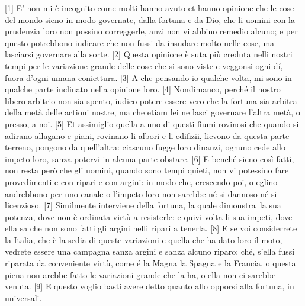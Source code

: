 
{[}1{]} E' non mi è incognito come molti hanno avuto et hanno opinione
che le cose del mondo sieno in modo governate, dalla fortuna e da Dio,
che li uomini con la prudenzia loro non possino correggerle, anzi non vi
abbino remedio alcuno; e per questo potrebbono iudicare che non fussi da
insudare molto nelle cose, ma lasciarsi governare alla sorte. {[}2{]}
Questa opinione è suta più creduta nelli nostri tempi per le variazione
grande delle cose che si sono viste e veggonsi ogni dí, fuora d'ogni
umana coniettura. {[}3{]} A che pensando io qualche volta, mi sono in
qualche parte inclinato nella opinione loro. {[}4{]} Nondimanco, perché
il nostro libero arbitrio non sia spento, iudico potere essere vero che
la fortuna sia arbitra della metà delle actioni nostre, ma che etiam lei
ne lasci governare l'altra metà, o presso, a noi. {[}5{]} Et assimiglio
quella a uno di questi fiumi rovinosi che quando si adirano allagano e
piani, rovinano li albori e li edifizii, lievono da questa parte
terreno, pongono da quell'altra: ciascuno fugge loro dinanzi, ognuno
cede allo impeto loro, sanza potervi in alcuna parte obstare. {[}6{]} E
benché sieno così fatti, non resta però che gli uomini, quando sono
tempi quieti, non vi potessino fare provedimenti e con ripari e con
argini: in modo che, crescendo poi, o eglino andrebbono per uno canale o
l'impeto loro non sarebbe né si dannoso né si licenzioso. {[}7{]}
Similmente interviene della fortuna, la quale dimonstra\est\ la sua potenza,
dove non è ordinata virtù a resisterle: e quivi volta li sua impeti,
dove ella sa che non sono fatti gli argini nelli ripari a tenerla.
{[}8{]} E se voi considerrete la Italia, che è la sedia di queste
variazioni e quella che ha dato loro il moto, vedrete essere una
campagna sanza argini e sanza alcuno riparo: ché, s'ella fussi riparata
da conveniente virtù, come é la Magna la Spagna e la Francia, o questa
piena non arebbe fatto le variazioni grande che la ha, o ella non ci
sarebbe venuta. {[}9{]} E questo voglio basti avere detto quanto allo
opporsi alla fortuna, in universali.

